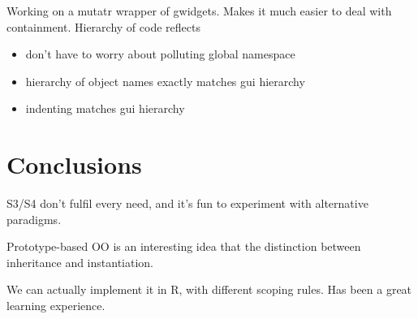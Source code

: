 \documentclass[oneside]{article}
\begin{document}
Working on a mutatr wrapper of gwidgets.  Makes it much easier to deal with containment.  Hierarchy of code reflects 

\begin{itemize}
  \item don't have to worry about polluting global namespace
  \item hierarchy of object names exactly matches gui hierarchy
  \item indenting matches gui hierarchy
\end{itemize}


\section{Conclusions}
\label{sec:conclusions}

S3/S4 don’t fulfil every need, and it’s fun to experiment with alternative paradigms.

Prototype-based OO is an interesting idea that the distinction between inheritance and instantiation.

We can actually implement it in R, with different scoping rules.  Has been a great learning experience.


\end{document}
